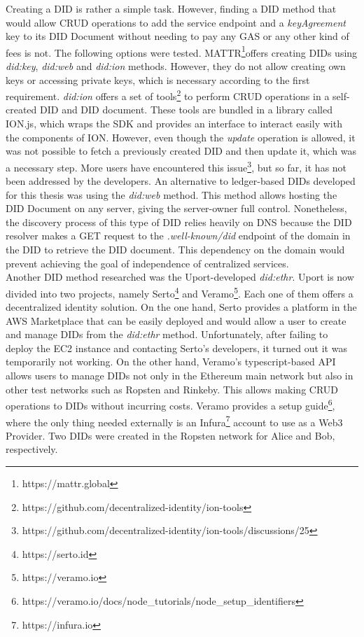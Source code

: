 Creating a DID is rather a simple task. However, finding a DID method that would allow CRUD operations to add the service endpoint and a \emph{keyAgreement} key to its DID Document without needing to pay any GAS or any other kind of fees is not. The following options were tested. MATTR\footnote{https://mattr.global}offers creating DIDs using \emph{did:key}, \emph{did:web} and \emph{did:ion} methods. However, they do not allow creating own keys or accessing private keys, which is necessary according to the first requirement. \emph{did:ion} offers a set of tools\footnote{https://github.com/decentralized-identity/ion-tools} to perform CRUD operations in a self-created DID and DID document. These tools are bundled in a library called ION.js, which wraps the SDK and provides an interface to interact easily with the components of ION. However, even though the \emph{update} operation is allowed, it was not possible to fetch a previously created DID and then update it, which was a necessary step. More users have encountered this issue\footnote{https://github.com/decentralized-identity/ion-tools/discussions/25}, but so far, it has not been addressed by the developers. An alternative to ledger-based DIDs developed for this thesis was using the \emph{did:web} method. This method allows hosting the DID Document on any server, giving the server-owner full control. Nonetheless, the discovery process of this type of DID relies heavily on DNS because the DID resolver makes a GET request to the \emph{.well-known/did} endpoint of the domain in the DID to retrieve the DID document. This dependency on the domain would prevent achieving the goal of independence of centralized services. \\
Another DID method researched was the Uport-developed \emph{did:ethr}. Uport is now divided into two projects, namely Serto\footnote{https://serto.id} and Veramo\footnote{https://veramo.io}. Each one of them offers a decentralized identity solution. On the one hand, Serto provides a platform in the AWS Marketplace that can be easily deployed and would allow a user to create and manage DIDs from the \emph{did:ethr} method. Unfortunately, after failing to deploy the EC2 instance and contacting Serto's developers, it turned out it was temporarily not working. On the other hand, Veramo's typescript-based API allows users to manage DIDs not only in the Ethereum main network but also in other test networks such as Ropsten and Rinkeby. This allows making CRUD operations to DIDs without incurring costs. Veramo provides a setup guide\footnote{https://veramo.io/docs/node\_tutorials/node\_setup\_identifiers}, where the only thing needed externally is an Infura\footnote{https://infura.io} account to use as a Web3 Provider. Two DIDs were created in the Ropsten network for Alice and Bob, respectively.


